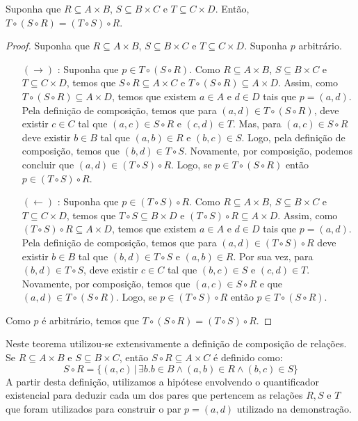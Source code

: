 \begin{Theorem}
Suponha que $R\subseteq A \times B$, $S \subseteq B \times C$ e $T
\subseteq C \times D$. Então, $T \circ (S \circ R) = (T \circ S) \circ
R$.
\end{Theorem}
\begin{proof}
Suponha que $R\subseteq A \times B$, $S \subseteq B \times C$ e $T
\subseteq C \times D$.
 Suponha $p$ arbitrário.
\begin{itemize}
  \item[$(\to)$]: Suponha que $p \in T \circ (S \circ R)$. Como
    $R\subseteq A \times B$, $S \subseteq B \times C$ e $T
\subseteq C \times D$, temos que $S \circ R \subseteq A \times C$ e
   $T \circ (S \circ R)\subseteq A \times D$. Assim, como  $T \circ (S
   \circ R)\subseteq A \times D$, temos que existem $a \in A$ e $d\in
   D$ tais que $p = (a,d)$. Pela definição de composição, temos que
   para $(a,d) \in T \circ (S \circ R)$, deve existir $c \in C$ tal
   que $(a,c) \in S \circ R$ e $(c,d) \in T$. Mas, para $(a,c) \in S
   \circ R$ deve existir $b\in B$ tal que $(a,b) \in R$ e $(b,c) \in
   S$. Logo, pela definição de composição, temos que $(b,d) \in T
   \circ S$. Novamente, por composição, podemos concluir que
   $(a,d) \in (T \circ S) \circ R$. Logo, se $p \in T \circ (S \circ
   R)$ então $p \in (T \circ S) \circ R$.
  \item[$(\leftarrow)$]: Suponha que $p \in (T \circ S) \circ R$. Como
    $R\subseteq A \times B$, $S \subseteq B \times C$ e $T
\subseteq C \times D$, temos que $T \circ S\subseteq B \times D$ e
 $(T\circ S) \circ R \subseteq A \times D$. Assim, como $(T\circ S)
 \circ R \subseteq A \times D$, temos que existem $a \in A$ e $d\in D$
 tais que $p = (a,d)$. Pela definição de composição, temos que para
 $(a,d) \in (T\circ S) \circ R$ deve existir  $b\in B$ tal que $(b,d)
 \in T \circ S$ e $(a,b) \in R$. Por sua vez, para $(b,d)
 \in T \circ S$, deve existir $c\in C$ tal que $(b,c) \in S$ e $(c,d)
 \in T$. Novamente, por composição, temos que $(a,c)\in S\circ R$ e
 que $(a,d) \in T\circ (S \circ R)$. Logo, se $p \in (T\circ S) \circ
 R$ então $p \in T \circ (S \circ R)$.
\end{itemize}
Como $p$ é arbitrário, temos que $T \circ (S \circ R) = (T \circ S)
\circ R$.
\end{proof}

\begin{Commentary}
Neste teorema utilizou-se extensivamente a definição de composição de
relações. Se $R \subseteq A \times  B$ e $S \subseteq B \times C$,
então $S\circ R \subseteq A \times C$ é definido como:
\[
S \circ R = \{(a,c) \,|\, \exists b. b\in B \land (a,b) \in R \land
(b,c) \in S\}
\]
A partir desta definição, utilizamos a hipótese envolvendo o
quantificador existencial para deduzir cada um dos pares que pertencem
as relações $R,S$ e $T$ que foram utilizados para construir o par $p =
(a,d)$ utilizado na demonstração.
\end{Commentary}

